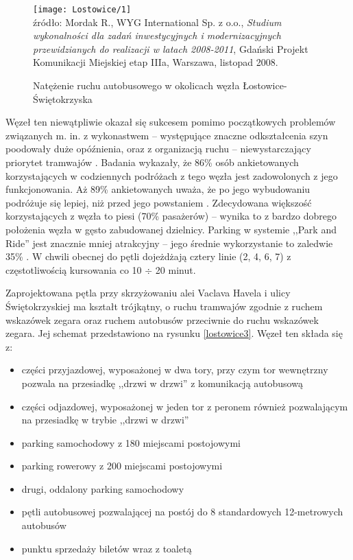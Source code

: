 \documentclass[twoside,12pt]{article}
\begin{document}
	\begin{figure}[H]
		\centering
		\caption{Natężenie ruchu autobusowego w okolicach węzła Łostowice-Świętokrzyska}
		\texttt{[image: Lostowice/1]}\\
		\footnotesize{źródło: Mordak R., WYG International Sp. z o.o., \emph{Studium wykonalności dla zadań inwestycyjnych i 
		modernizacyjnych przewidzianych do realizacji w latach 2008-2011}, Gdański Projekt Komunikacji Miejskiej etap IIIa, 
		Warszawa, listopad 2008. \cite{opracowanie_gdansk}}
		\label{lostowice2}
	\end{figure}
	
	Węzeł ten niewątpliwie okazał się sukcesem pomimo początkowych problemów związanych m. in. z wykonastwem -- występujące znaczne odkształcenia szyn poodowały duże opóźnienia, oraz z organizacją ruchu -- niewystarczający priorytet tramwajów \cite{kaszubowski}. Badania wykazały, że 86\% osób ankietowanych korzystających w codziennych podróżach z tego węzła jest zadowolonych z jego funkcjonowania. Aż 89\% ankietowanych uważa, że po jego wybudowaniu podróżuje się lepiej, niż przed jego powstaniem \cite{maciej_lada}. Zdecydowana większość korzystających z węzła to piesi (70\% pasażerów) -- wynika to z bardzo dobrego położenia węzła w gęsto zabudowanej dzielnicy. Parking w systemie ,,Park and Ride'' jest znacznie mniej atrakcyjny -- jego średnie wykorzystanie to zaledwie 35\% \cite{kaszubowski}. W chwili obecnej do pętli dojeżdżają cztery linie (2, 4, 6, 7) z częstotliwością kursowania co 10 $\div$ 20 minut. 
	
	Zaprojektowana pętla przy skrzyżowaniu alei Vaclava Havela i ulicy Świętokrzyskiej ma kształt trójkątny, o ruchu tramwajów zgodnie z ruchem wskazówek zegara oraz ruchem autobusów przeciwnie do ruchu wskazówek zegara. Jej schemat przedstawiono na rysunku \ref{lostowice3}. Węzeł ten składa się z:
	\begin{itemize}\setlength{\itemsep}{0em}
	\item części przyjazdowej, wyposażonej w dwa tory, przy czym tor wewnętrzny pozwala na przesiadkę ,,drzwi w drzwi'' z komunikacją autobusową
	\item części odjazdowej, wyposażonej w jeden tor z peronem również pozwalającym  na przesiadkę w trybie ,,drzwi w drzwi''
	\item parking samochodowy z 180 miejscami postojowymi
	\item parking rowerowy z 200 miejscami postojowymi
	\item drugi, oddalony parking samochodowy
	\item pętli autobusowej pozwalającej na postój do 8 standardowych 12-metrowych autobusów
	\item punktu sprzedaży biletów wraz z toaletą
	\end{itemize}
	
\end{document}
